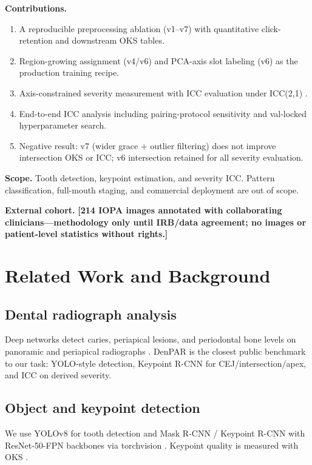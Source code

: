 \documentclass[conference]{IEEEtran}
\newcommand{\placeholder}[1]{\textcolor{placeholdergreen}{\textbf{[#1]}}}
\begin{document}
\textbf{Contributions.}
\begin{enumerate}
  \item A reproducible preprocessing ablation (v1--v7) with quantitative click-retention and downstream OKS tables.
  \item Region-growing assignment (v4/v6) and PCA-axis slot labeling (v6) as the production training recipe.
  \item Axis-constrained severity measurement with ICC evaluation under ICC(2,1) \cite{shrout1979icc,koo2016icc}.
  \item End-to-end ICC analysis including pairing-protocol sensitivity and val-locked hyperparameter search.
  \item Negative result: v7 (wider grace + outlier filtering) does not improve intersection OKS or ICC; v6 intersection retained for all severity evaluation.
\end{enumerate}

\textbf{Scope.} Tooth detection, keypoint estimation, and severity ICC. Pattern classification, full-mouth staging, and commercial deployment are out of scope.

\textbf{External cohort.} \placeholder{214 IOPA images annotated with collaborating clinicians---methodology only until IRB/data agreement; no images or patient-level statistics without rights.}

\section{Related Work and Background}
\label{sec:related}

\subsection{Dental radiograph analysis}
Deep networks detect caries, periapical lesions, and periodontal bone levels on panoramic and periapical radiographs \cite{schwendicke2020dl_dental,lecun2015deep}. DenPAR \cite{denpar2026} is the closest public benchmark to our task: YOLO-style detection, Keypoint R-CNN for CEJ/intersection/apex, and ICC on derived severity.

\subsection{Object and keypoint detection}
We use YOLOv8 \cite{jocher2023yolo} for tooth detection and Mask R-CNN / Keypoint R-CNN \cite{he2017mask} with ResNet-50-FPN backbones via torchvision \cite{torchvision2016}. Keypoint quality is measured with OKS \cite{anderson2019oks}.
\end{document}
